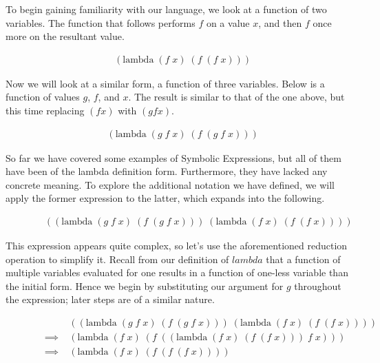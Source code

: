 To begin gaining familiarity with our language, we look at a function of two
variables. The function that follows performs $f$ on a value $x$, and then $f$
once more on the resultant value.

\begin{figure}[ht]
\caption{}\label{scheme}
\begin{align*}
& (\text{lambda} \; (f \; x) \; (f \; (f \; x)))
\end{align*}
\end{figure}

Now we will look at a similar form, a function of three variables. Below is a
function of values $g$, $f$, and $x$. The result is similar to that of the one
above, but this time replacing $(f x)$ with $(g f x)$.

\begin{figure}[ht]
\caption{}\label{scheme}
\begin{align*}
& (\text{lambda} \; (g \; f \; x) \; (f \; (g \; f \; x)))
\end{align*}
\end{figure}

So far we have covered some examples of Symbolic Expressions, but all of them have 
been of the lambda definition form. Furthermore, they have lacked any concrete
meaning. To explore the additional notation we have defined, we will apply the
former expression to the latter, which expands into the following.

\begin{figure}[ht]
\caption{}\label{scheme}
\begin{align*}
& ((\text{lambda} \; (g \; f \; x) \; (f \; (g \; f \; x))) \; (\text{lambda} \; (f \; x) \; (f \; (f \; x))))
\end{align*}
\end{figure}

This expression appears quite complex, so let's use the aforementioned reduction 
operation to simplify it. Recall from our definition of $lambda$ that a function
of multiple variables evaluated for one results in a function of one-less variable 
than the initial form. Hence we begin by substituting our argument for $g$
throughout the expression; later steps are of a similar nature.

\begin{figure}[ht]
\caption{}\label{scheme}
\begin{align*}
& &((\text{lambda} \; (g \; f \; x) \; (f \; (g \; f \; x))) \; (\text{lambda} \; (f \; x) \; (f \; (f \; x))))
\\& \implies \; &(\text{lambda} \; (f \; x) \; (f \; ((\text{lambda} \; (f \; x) \; (f \; (f \; x))) \; f \; x)))
\\& \implies \; &(\text{lambda} \; (f \; x) \; (f \; (f \; (f \; x))))
\end{align*}
\end{figure}


